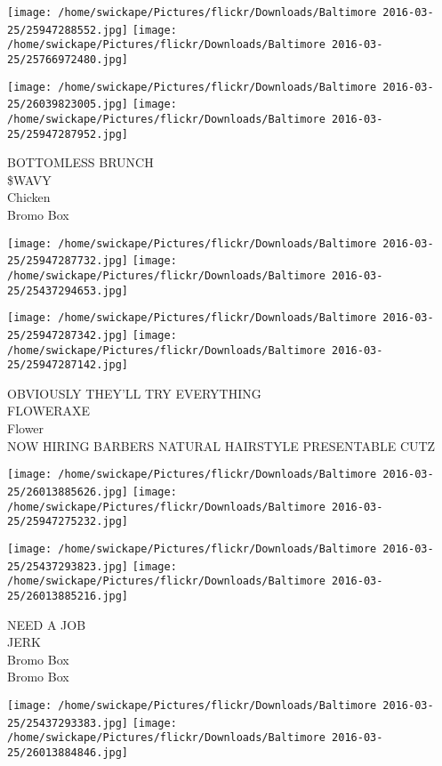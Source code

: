 \documentclass[10pt,letterpaper]{article}
\begin{document}
\texttt{[image: /home/swickape/Pictures/flickr/Downloads/Baltimore 2016-03-25/25947288552.jpg]}
\texttt{[image: /home/swickape/Pictures/flickr/Downloads/Baltimore 2016-03-25/25766972480.jpg]}

\texttt{[image: /home/swickape/Pictures/flickr/Downloads/Baltimore 2016-03-25/26039823005.jpg]}
\texttt{[image: /home/swickape/Pictures/flickr/Downloads/Baltimore 2016-03-25/25947287952.jpg]}

BOTTOMLESS BRUNCH\\
\$WAVY\\
Chicken\\
Bromo Box\\
\pagebreak

\texttt{[image: /home/swickape/Pictures/flickr/Downloads/Baltimore 2016-03-25/25947287732.jpg]}
\texttt{[image: /home/swickape/Pictures/flickr/Downloads/Baltimore 2016-03-25/25437294653.jpg]}

\texttt{[image: /home/swickape/Pictures/flickr/Downloads/Baltimore 2016-03-25/25947287342.jpg]}
\texttt{[image: /home/swickape/Pictures/flickr/Downloads/Baltimore 2016-03-25/25947287142.jpg]}

OBVIOUSLY THEY'LL TRY EVERYTHING\\
FLOWERAXE\\
Flower\\
NOW HIRING BARBERS NATURAL HAIRSTYLE PRESENTABLE CUTZ\\
\pagebreak

\texttt{[image: /home/swickape/Pictures/flickr/Downloads/Baltimore 2016-03-25/26013885626.jpg]}
\texttt{[image: /home/swickape/Pictures/flickr/Downloads/Baltimore 2016-03-25/25947275232.jpg]}

\texttt{[image: /home/swickape/Pictures/flickr/Downloads/Baltimore 2016-03-25/25437293823.jpg]}
\texttt{[image: /home/swickape/Pictures/flickr/Downloads/Baltimore 2016-03-25/26013885216.jpg]}

NEED A JOB\\
JERK\\
Bromo Box\\
Bromo Box\\
\pagebreak

\texttt{[image: /home/swickape/Pictures/flickr/Downloads/Baltimore 2016-03-25/25437293383.jpg]}
\texttt{[image: /home/swickape/Pictures/flickr/Downloads/Baltimore 2016-03-25/26013884846.jpg]}
\end{document}
